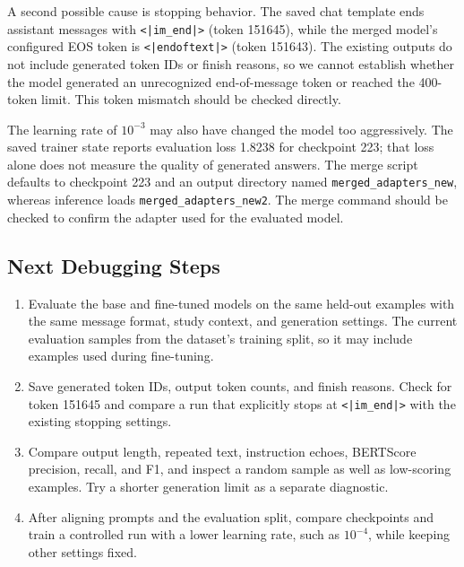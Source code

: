 A second possible cause is stopping behavior. The saved chat template ends assistant messages with \texttt{<|im\_end|>} (token 151645), while the merged model's configured EOS token is \texttt{<|endoftext|>} (token 151643). The existing outputs do not include generated token IDs or finish reasons, so we cannot establish whether the model generated an unrecognized end-of-message token or reached the 400-token limit. This token mismatch should be checked directly.

The learning rate of $10^{-3}$ may also have changed the model too aggressively. The saved trainer state reports evaluation loss 1.8238 for checkpoint 223; that loss alone does not measure the quality of generated answers. The merge script defaults to checkpoint 223 and an output directory named \texttt{merged\_adapters\_new}, whereas inference loads \texttt{merged\_adapters\_new2}. The merge command should be checked to confirm the adapter used for the evaluated model.

\subsection{Next Debugging Steps}

\begin{enumerate}
    \item Evaluate the base and fine-tuned models on the same held-out examples with the same message format, study context, and generation settings. The current evaluation samples from the dataset's training split, so it may include examples used during fine-tuning.
    \item Save generated token IDs, output token counts, and finish reasons. Check for token 151645 and compare a run that explicitly stops at \texttt{<|im\_end|>} with the existing stopping settings.
    \item Compare output length, repeated text, instruction echoes, BERTScore precision, recall, and F1, and inspect a random sample as well as low-scoring examples. Try a shorter generation limit as a separate diagnostic.
    \item After aligning prompts and the evaluation split, compare checkpoints and train a controlled run with a lower learning rate, such as $10^{-4}$, while keeping other settings fixed.
\end{enumerate}
